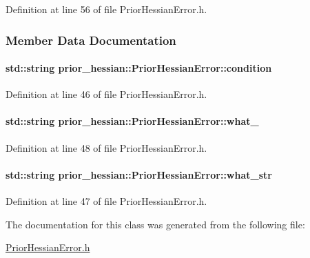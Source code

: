 Definition at line 56 of file Prior\+Hessian\+Error.\+h.



\subsubsection{Member Data Documentation}
\paragraph[{\texorpdfstring{condition}{condition}}]{\setlength{\rightskip}{0pt plus 5cm}std\+::string prior\+\_\+hessian\+::\+Prior\+Hessian\+Error\+::condition\hspace{0.3cm}{\ttfamily [protected]}}\hypertarget{classprior__hessian_1_1PriorHessianError_a0f00dbb23dc6ba9b3577503755b018c5}{}\label{classprior__hessian_1_1PriorHessianError_a0f00dbb23dc6ba9b3577503755b018c5}


Definition at line 46 of file Prior\+Hessian\+Error.\+h.

\paragraph[{\texorpdfstring{what\+\_\+}{what_}}]{\setlength{\rightskip}{0pt plus 5cm}std\+::string prior\+\_\+hessian\+::\+Prior\+Hessian\+Error\+::what\+\_\+\hspace{0.3cm}{\ttfamily [protected]}}\hypertarget{classprior__hessian_1_1PriorHessianError_a018e11b5863c2a3a06d37a16a89b14b2}{}\label{classprior__hessian_1_1PriorHessianError_a018e11b5863c2a3a06d37a16a89b14b2}


Definition at line 48 of file Prior\+Hessian\+Error.\+h.

\paragraph[{\texorpdfstring{what\+\_\+str}{what_str}}]{\setlength{\rightskip}{0pt plus 5cm}std\+::string prior\+\_\+hessian\+::\+Prior\+Hessian\+Error\+::what\+\_\+str\hspace{0.3cm}{\ttfamily [protected]}}\hypertarget{classprior__hessian_1_1PriorHessianError_a0d97e1b6b1bcf6a440400706f416375e}{}\label{classprior__hessian_1_1PriorHessianError_a0d97e1b6b1bcf6a440400706f416375e}


Definition at line 47 of file Prior\+Hessian\+Error.\+h.



The documentation for this class was generated from the following file\+:\begin{DoxyCompactItemize}
\item 
\hyperlink{PriorHessianError_8h}{Prior\+Hessian\+Error.\+h}\end{DoxyCompactItemize}
